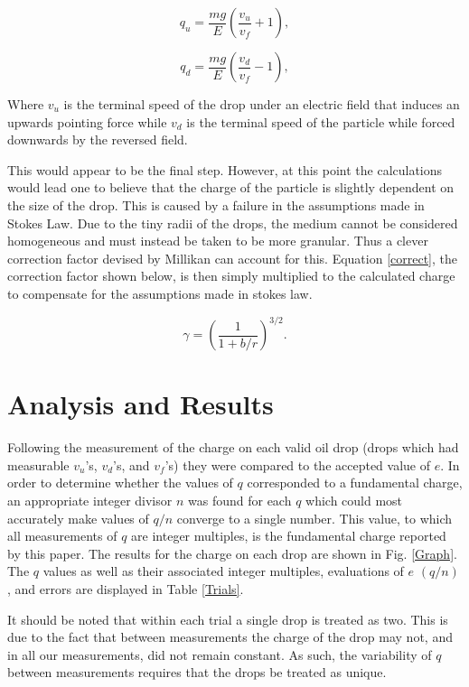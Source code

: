 \documentclass[prb,preprint]{revtex4-1}
\begin{document}
\begin{equation}\label{qu}
q_u = \frac{mg}{E}\left(\frac{v_u}{v_f}+1\right),
\end{equation}

\begin{equation}\label{qd}
q_d=\frac{mg}{E}\left(\frac{v_d}{v_f}-1\right),
\end{equation}

Where $v_u$ is the terminal speed of the drop under an electric field that induces an upwards pointing force while $v_d$ is the terminal speed of the particle while forced downwards by the reversed field.

This would appear to be the final step. However, at this point the calculations would lead one to believe that the charge of the particle is slightly dependent on the size of the drop. This is caused by a failure in the assumptions made in Stokes Law. Due to the tiny radii of the drops, the medium cannot be considered homogeneous and must instead be taken to be more granular. Thus a clever correction factor devised by Millikan can account for this. Equation \eqref{correct}, the correction factor shown below, is then simply multiplied to the calculated charge to compensate for the assumptions made in stokes law.

\begin{equation}\label{correct}
\gamma = \left (\frac{1}{1+b/r}\right)^{3/2} .
\end{equation}

\section{Analysis and Results}

Following the measurement of the charge on each valid oil drop (drops which had measurable $v_u$'s, $v_d$'s, and $v_f$'s) they were compared to the accepted value of $e$. In order to determine whether the values of $q$ corresponded to a fundamental charge, an appropriate integer divisor $n$ was found for each $q$ which could most accurately make values of $q/n$ converge to a single number. This value, to which all measurements of $q$ are integer multiples, is the fundamental charge reported by this paper. The results for the charge on each drop are shown in Fig. \ref{Graph}. The $q$ values as well as their associated integer multiples, evaluations of $e$ $(q/n)$, and errors are displayed in Table \ref{Trials}.

It should be noted that within each trial a single drop is treated as two. This is due to the fact that between measurements the charge of the drop may not, and in all our measurements, did not remain constant. As such, the variability of $q$ between measurements requires that the drops be treated as unique.
\end{document}
